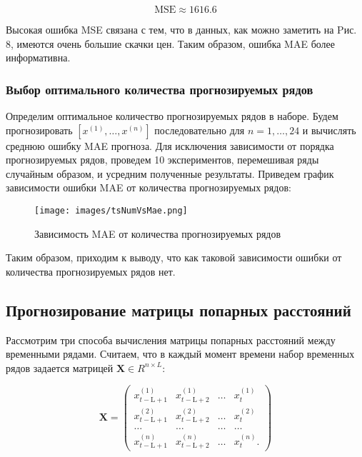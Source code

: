 \documentclass{article}
\begin{document}
\begin{equation}
    \text{MSE} \approx 1616.6
\end{equation}

Высокая ошибка MSE связана с тем, что в данных, как можно заметить на Pис. 8, имеются очень большие скачки цен. Таким образом, ошибка MAE более информативна.

\subsubsection{Выбор оптимального количества прогнозируемых рядов}

Определим оптимальное количество прогнозируемых рядов в наборе. Будем прогнозировать $[x^{(1)}, \ldots, x^{(n)}]$ последовательно для $n = 1, \ldots, 24$ и вычислять среднюю ошибку MAE прогноза. Для исключения зависимости от порядка прогнозируемых рядов, проведем 10 экспериментов, перемешивая ряды случайным образом, и усредним полученные результаты. Приведем график зависимости ошибки MAE от количества прогнозируемых рядов:

\begin{figure}[!htbp]
\centering
{\texttt{[image: images/tsNumVsMae.png]} }
\caption{Зависимость MAE от количества прогнозируемых рядов}
\label{fig:NumMae}
\end{figure}

Таким образом, приходим к выводу, что как таковой зависимости ошибки от количества прогнозируемых рядов нет.

\subsection{Прогнозирование матрицы попарных расстояний}

Рассмотрим три способа вычисления матрицы попарных расстояний между временными рядами. Считаем, что в каждый момент времени набор временных рядов задается матрицей $\textbf{X} \in R^{n \times L}$:


\begin{equation}
\textbf{X} = \left( \begin{array}{cccc}
x^{(1)}_{t - \text{L} + 1} & x^{(1)}_{t - \text{L} + 2} & \ldots & x^{(1)}_{t} \\
x^{(2)}_{t - \text{L} + 1} & x^{(2)}_{t - \text{L} + 2} & \ldots & x^{(2)}_{t} \\
\ldots & \ldots & \ldots & \ldots \\
x^{(n)}_{t - \text{L} + 1} & x^{(n)}_{t - \text{L} + 2} & \ldots & x^{(n)}_{t}.
\end{array}\right)
\end{equation}
\end{document}
